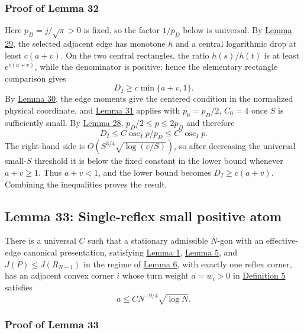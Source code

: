\documentclass[11pt]{article}
\begin{document}
\subsubsection{Proof of Lemma
32}\label{proof-lem-reflex-edge-pressure-comparison}

Here \(p_D=j/\sqrt\pi>0\) is fixed, so the factor \(1/p_D\) below is
universal. By \hyperref[lem-reflex-monotone-edge]{Lemma 29}, the
selected adjacent edge has monotone \(h\) and a central logarithmic drop
at least \(c(a+v)\). On the two central rectangles, the ratio
\(h(s)/h(t)\) is at least \(e^{c(a+v)}\), while the denominator is
positive; hence the elementary rectangle comparison gives \[
D_I\ge c\min\{a+v,1\}.
\] By \hyperref[lem-physical-pressure-moment]{Lemma 30}, the edge
moments give the centered condition in the normalized physical
coordinate, and \hyperref[lem-monotone-weight-comparison]{Lemma 31}
applies with \(p_0=p_D/2\), \(C_0=4\) once \(S\) is sufficiently small.
By \hyperref[lem-edge-pressure-oscillation]{Lemma 28},
\(p_D/2\le p\le2p_D\) and therefore \[
D_I\le C\operatorname{osc}_I p/p_D\le C'\operatorname{osc}_I p.
\] The right-hand side is \(O(S^{3/4}\sqrt{\log(e/S)})\), so after
decreasing the universal small-\(S\) threshold it is below the fixed
constant in the lower bound whenever \(a+v\ge1\). Thus \(a+v<1\), and
the lower bound becomes \(D_I\ge c(a+v)\). Combining the inequalities
proves the result.

\subsection{Lemma 33: Single-reflex small positive
atom}\label{lem-single-reflex-small-atom}

There is a universal \(C\) such that a stationary admissible \(N\)-gon
with an effective-edge canonical presentation, satisfying
\hyperref[lem-edge-moments]{Lemma 1},
\hyperref[lem-disk-perturbation]{Lemma 5}, and \(J(P)\le J(R_{N-1})\) in
the regime of \hyperref[lem-near-circle-conformal]{Lemma 6}, with
exactly one reflex corner, has an adjacent convex corner \(i\) whose
turn weight \(a=w_i>0\) in \hyperref[def-turn-measure]{Definition 5}
satisfies \[
a\le C N^{-9/4}\sqrt{\log N}.
\]

\subsubsection{Proof of Lemma
33}\label{proof-lem-single-reflex-small-atom}
\end{document}
